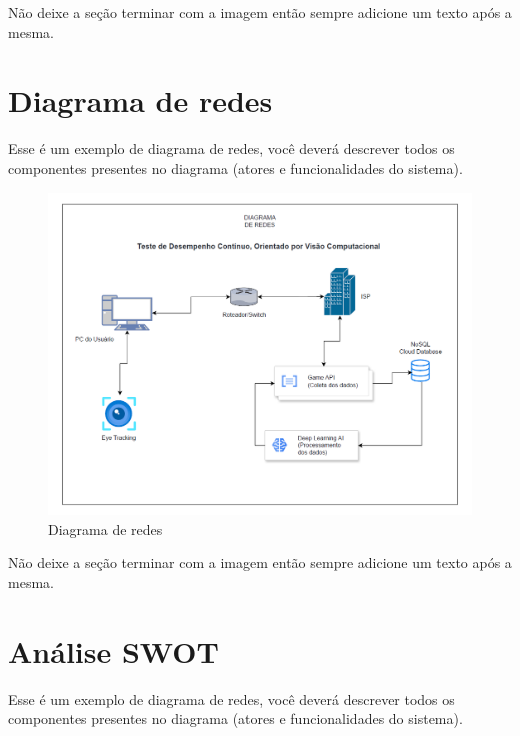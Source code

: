 \documentclass[
  a4paper,%
  12pt,%
  english,%
  brazilian,%
]{article}
\begin{document}
    Não deixe a seção terminar com a imagem então sempre adicione um texto após a mesma.

\section*{Diagrama de redes}
    
    Esse é um exemplo de diagrama de redes, você deverá descrever todos os componentes presentes no diagrama (atores e funcionalidades do sistema).

\begin{figure}[H]
\centering
\caption{Diagrama de redes}%
\label{fig:diagrama-de-redes}
\includegraphics[width=1.1\textwidth]{Logos/diagrama-de-redes.png}
\end{figure}

    Não deixe a seção terminar com a imagem então sempre adicione um texto após a mesma.

\section*{Análise SWOT}

    Esse é um exemplo de diagrama de redes, você deverá descrever todos os componentes presentes no diagrama (atores e funcionalidades do sistema).
\end{document}
